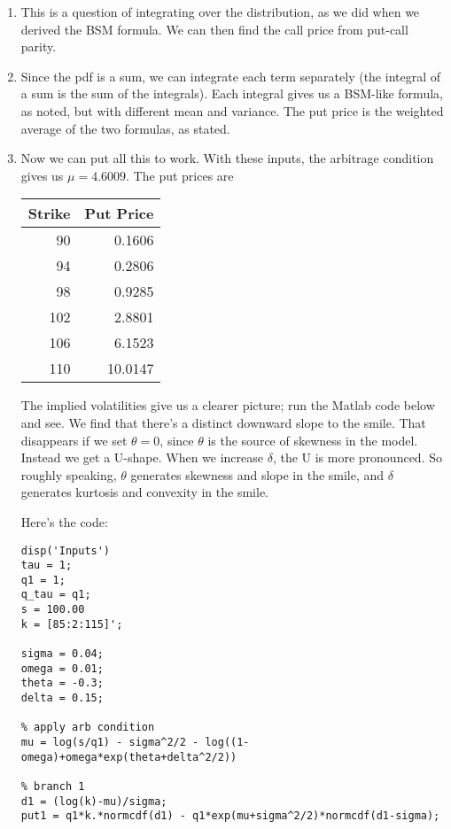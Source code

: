 \documentclass[11pt]{article}
\begin{document}
\begin{enumerate}
\begin{enumerate}
\item This is a question of integrating over the distribution,
as we did when we derived the BSM formula.
We can then find the call price from put-call parity.

\item Since the pdf is a sum, we can integrate
each term separately (the integral of a sum is the sum of the integrals).
Each integral gives us a BSM-like formula, as noted,
but with different mean and variance.
The put price is the weighted average of the two formulas, as stated.

\item Now we can put all this to work.
With these inputs, the arbitrage condition gives us $ \mu = 4.6009$.
The put prices are

\begin{center}
\tabcolsep=0.15in
\begin{tabular}{rr}
\toprule
Strike    &  Put Price  \\
\midrule
  90   & 0.1606   \\
   94  &  0.2806  \\
   98  &  0.9285  \\
  102  &  2.8801  \\
  106  &  6.1523  \\
  110  & 10.0147 \\
\bottomrule
\end{tabular}
\end{center}

The implied volatilities give us a clearer picture;
run the Matlab code below and see.
We find that there's a distinct downward slope to the smile.
That disappears if we set $\theta = 0$, since $\theta$ is the source
of skewness in the model.
Instead we get a U-shape.
When we increase $\delta$, the U is more pronounced.
So roughly speaking, $\theta$ generates skewness and slope
in the smile,
and $\delta$ generates kurtosis and convexity in the smile.

Here's the code:
\begin{verbatim}
disp('Inputs')
tau = 1;
q1 = 1;
q_tau = q1;
s = 100.00
k = [85:2:115]';

sigma = 0.04;
omega = 0.01;
theta = -0.3;
delta = 0.15;

% apply arb condition
mu = log(s/q1) - sigma^2/2 - log((1-omega)+omega*exp(theta+delta^2/2))

% branch 1
d1 = (log(k)-mu)/sigma;
put1 = q1*k.*normcdf(d1) - q1*exp(mu+sigma^2/2)*normcdf(d1-sigma);


\end{verbatim}
\end{enumerate}
\end{enumerate}
\end{document}
